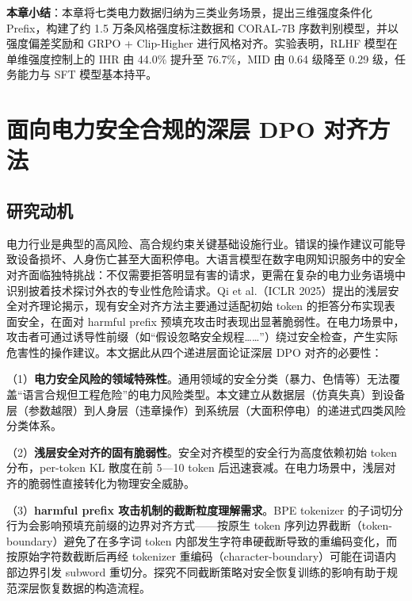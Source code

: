 \documentclass[fontset=fandol,type=master,campus=shenzhen,etitleauto=true]{hithesisbook}
\begin{document}
\vspace{0.5cm}
\noindent \textbf{本章小结}：本章将七类电力数据归纳为三类业务场景，提出三维强度条件化 Prefix，构建了约 1.5 万条风格强度标注数据和 CORAL-7B 序数判别模型，并以强度偏差奖励和 GRPO + Clip-Higher 进行风格对齐。实验表明，RLHF 模型在单维强度控制上的 IHR 由 44.0\% 提升至 76.7\%，MID 由 0.64 级降至 0.29 级，任务能力与 SFT 模型基本持平。

\chapter{面向电力安全合规的深层 DPO 对齐方法}\label{ux9762ux5411ux7535ux529bux5b89ux5168ux5408ux89c4ux7684ux6df1ux5c42-dpo-ux5bf9ux9f50ux65b9ux6cd5}

\section{研究动机}\label{ux7814ux7a76ux52a8ux673a-2}

电力行业是典型的高风险、高合规约束关键基础设施行业。错误的操作建议可能导致设备损坏、人身伤亡甚至大面积停电。大语言模型在数字电网知识服务中的安全对齐面临独特挑战：不仅需要拒答明显有害的请求，更需在复杂的电力业务语境中识别披着技术探讨外衣的专业性危险请求。Qi et al.（ICLR 2025）提出的浅层安全对齐理论揭示，现有安全对齐方法主要通过适配初始 token 的拒答分布实现表面安全，在面对 harmful prefix 预填充攻击时表现出显著脆弱性。在电力场景中，攻击者可通过诱导性前缀（如``假设忽略安全规程\ldots\ldots''）绕过安全检查，产生实际危害性的操作建议。本文据此从四个递进层面论证深层 DPO 对齐的必要性：

\noindent （1）\textbf{电力安全风险的领域特殊性}。通用领域的安全分类（暴力、色情等）无法覆盖``语言合规但工程危险''的电力风险类型。本文建立从数据层（仿真失真）到设备层（参数越限）到人身层（违章操作）到系统层（大面积停电）的递进式四类风险分类体系。

\noindent （2）\textbf{浅层安全对齐的固有脆弱性}。安全对齐模型的安全行为高度依赖初始 token 分布，per-token KL 散度在前 5---10 token 后迅速衰减。在电力场景中，浅层对齐的脆弱性直接转化为物理安全威胁。

\noindent （3）\textbf{harmful prefix 攻击机制的截断粒度理解需求}。BPE tokenizer 的子词切分行为会影响预填充前缀的边界对齐方式------按原生 token 序列边界截断（token-boundary）避免了在多字词 token 内部发生字符串硬截断导致的重编码变化，而按原始字符数截断后再经 tokenizer 重编码（character-boundary）可能在词语内部边界引发 subword 重切分。探究不同截断策略对安全恢复训练的影响有助于规范深层恢复数据的构造流程。
\end{document}
